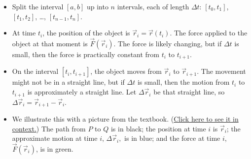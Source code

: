 \begin{itemize}
    \item Split the interval $[a,b]$ up into $n$ intervals, each of length $\Delta t$: $[t_0,t_1]$, $[t_1,t_2]$, \dots, $[t_{n-1},t_n]$.
    \item At time $t_i$, the position of the object is $\vec{r}_i=\vec{r}(t_i)$. The force applied to the object at that moment is $\vec{F}(\vec{r}_i)$. The force is likely changing, but if $\Delta t$ is small, then the force is practically constant from $t_i$ to $t_{i+1}$.
    \item On the interval $[t_i,t_{i+1}]$, the object moves from $\vec{r}_i$ to $\vec{r}_{i+1}$. The movement might not be in a straight line, but if $\Delta t$ is small, then the motion from $t_i$ to $t_{i+1}$ is approximately a straight line. Let $\Delta\vec{r}_i$ be that straight line, so $\Delta\vec{r}_i=\vec{r}_{i+1}-\vec{r}_i$.
    \item We illustrate this with a picture from the textbook. (\href{https://activecalculus.org/vector/S_Vector_IdeaLineIntegral.html\#SS_Vector_IdeaLineIntegral_LineIntegrals}{Click here to see it in context.}) 
    The path from $P$ to $Q$ is in black; the position at time $i$ is $\vec{r}_i$; the approximate motion at time $i$, $\Delta\vec{r}_i,$ is in blue; and the force at time $i$, $\vec{F}(\vec{r}_i)$, is in green.
    

\end{itemize}
